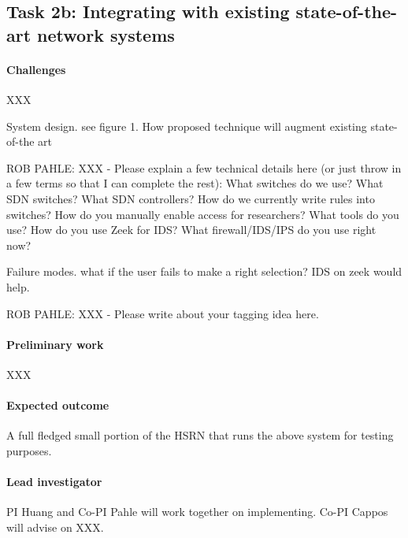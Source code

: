 \subsection{Task 2b: Integrating with existing state-of-the-art network systems}

\paragraph{Challenges} XXX

System design. see figure 1. How proposed technique will augment existing state-of-the art

ROB PAHLE: XXX - Please explain a few technical details here (or just throw in a few terms so that I can complete the rest):
What switches do we use?
What SDN switches? What SDN controllers?
How do we currently write rules into switches?
How do you manually enable access for researchers? What tools do you use?
How do you use Zeek for IDS?
What firewall/IDS/IPS do you use right now?

Failure modes. what if the user fails to make a right selection? IDS on zeek would help.

ROB PAHLE: XXX - Please write about your tagging idea here.

\paragraph{Preliminary work} XXX

\paragraph{Expected outcome} A full fledged small portion of the HSRN that runs the above system for testing purposes.

\paragraph{Lead investigator} PI Huang and Co-PI Pahle will work together on implementing. Co-PI Cappos will advise on XXX.
